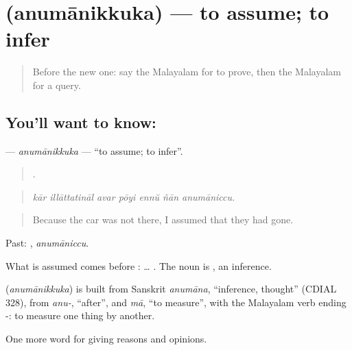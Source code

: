 \section[\texorpdfstring{\ml{അനുമാനിക്കുക} (anumānikkuka)}{അനുമാനിക്കുക (anumānikkuka)}]{ (anumānikkuka) — to assume; to infer}

\label{lesson:ML-C407-anumanikkuka}



\begin{quote}
Before the new one: say the Malayalam for to prove, then the Malayalam for a query.
\end{quote}

\subsection*{You'll want to know: }
\textbf{} — \emph{anumānikkuka} — \textquotedblleft{}to assume; to infer\textquotedblright{}.

\begin{quote}
      .
\end{quote}

\begin{quote}
\emph{kār illāttatināl avar pōyi ennŭ ñān anumāniccu.}
\end{quote}

\begin{quote}
Because the car was not there, I assumed that they had gone.
\end{quote}

Past: , \emph{anumāniccu}.

What is assumed comes before : …  . The noun is , an inference.

\begin{cousinweb}
\textbf{} (\emph{anumānikkuka}) is built from Sanskrit \emph{anumāna}, \textquotedblleft{}inference, thought\textquotedblright{} (CDIAL 328), from \emph{anu-}, \textquotedblleft{}after\textquotedblright{}, and \emph{mā}, \textquotedblleft{}to measure\textquotedblright{}, with the Malayalam verb ending -: to measure one thing by another.
\end{cousinweb}

\begin{grammarlens}[title={What you've built}]
One more word for giving reasons and opinions.
\end{grammarlens}

